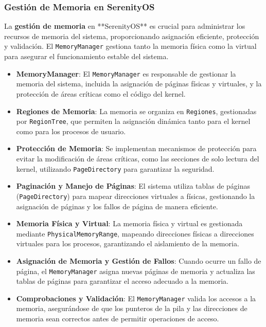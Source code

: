 \subsubsection{Gestión de Memoria en SerenityOS}

La \textbf{gestión de memoria} en **SerenityOS** es crucial para administrar los recursos de memoria del sistema, proporcionando asignación eficiente, protección y validación. El \texttt{MemoryManager} gestiona tanto la memoria física como la virtual para asegurar el funcionamiento estable del sistema.

\begin{itemize}
  \item \textbf{MemoryManager}: El \texttt{MemoryManager} es responsable de gestionar la memoria del sistema, incluida la asignación de páginas físicas y virtuales, y la protección de áreas críticas como el código del kernel.
  \item \textbf{Regiones de Memoria}: La memoria se organiza en \texttt{Regiones}, gestionadas por \texttt{RegionTree}, que permiten la asignación dinámica tanto para el kernel como para los procesos de usuario.
  \item \textbf{Protección de Memoria}: Se implementan mecanismos de protección para evitar la modificación de áreas críticas, como las secciones de solo lectura del kernel, utilizando \texttt{PageDirectory} para garantizar la seguridad.
  \item \textbf{Paginación y Manejo de Páginas}: El sistema utiliza tablas de páginas (\texttt{PageDirectory}) para mapear direcciones virtuales a físicas, gestionando la asignación de páginas y los fallos de página de manera eficiente.
  \item \textbf{Memoria Física y Virtual}: La memoria física y virtual es gestionada mediante \texttt{PhysicalMemoryRange}, mapeando direcciones físicas a direcciones virtuales para los procesos, garantizando el aislamiento de la memoria.
  \item \textbf{Asignación de Memoria y Gestión de Fallos}: Cuando ocurre un fallo de página, el \texttt{MemoryManager} asigna nuevas páginas de memoria y actualiza las tablas de páginas para garantizar el acceso adecuado a la memoria.
  \item \textbf{Comprobaciones y Validación}: El \texttt{MemoryManager} valida los accesos a la memoria, asegurándose de que los punteros de la pila y las direcciones de memoria sean correctos antes de permitir operaciones de acceso.
\end{itemize}

